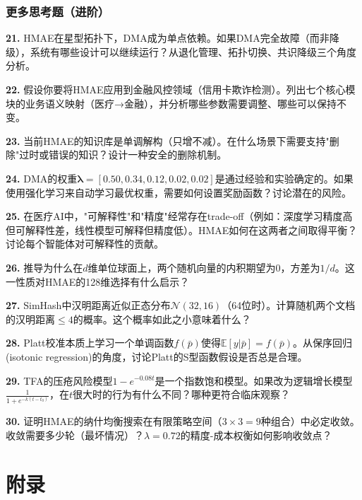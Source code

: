 \documentclass[11pt,a4paper]{ctexart}
\begin{document}
\newpage

\section{更多思考题（进阶）}

\begin{exerbox}
\textbf{21.} HMAE在星型拓扑下，DMA成为单点依赖。如果DMA完全故障（而非降级），系统有哪些设计可以继续运行？从退化管理、拓扑切换、共识降级三个角度分析。

\textbf{22.} 假设你要将HMAE应用到金融风控领域（信用卡欺诈检测）。列出七个核心模块的业务语义映射（医疗→金融），并分析哪些参数需要调整、哪些可以保持不变。

\textbf{23.} 当前HMAE的知识库是单调解构（只增不减）。在什么场景下需要支持"删除"过时或错误的知识？设计一种安全的删除机制。

\textbf{24.} DMA的权重$\boldsymbol{\lambda} = [0.50, 0.34, 0.12, 0.02, 0.02]$是通过经验和实验确定的。如果使用强化学习来自动学习最优权重，需要如何设置奖励函数？讨论潜在的风险。

\textbf{25.} 在医疗AI中，"可解释性"和"精度"经常存在trade-off（例如：深度学习精度高但可解释性差，线性模型可解释但精度低）。HMAE如何在这两者之间取得平衡？讨论每个智能体对可解释性的贡献。
\end{exerbox}

\begin{exerbox}
\textbf{26.} 推导为什么在$d$维单位球面上，两个随机向量的内积期望为0，方差为$1/d$。这一性质对HMAE的128维选择有什么启示？

\textbf{27.} SimHash中汉明距离近似正态分布$\mathcal{N}(32, 16)$（64位时）。计算随机两个文档的汉明距离$\leq 4$的概率。这个概率如此之小意味着什么？

\textbf{28.} Platt校准本质上学习一个单调函数$f(\bar{p})$使得$\mathbb{E}[y|\bar{p}] = f(\bar{p})$。从保序回归(isotonic regression)的角度，讨论Platt的S型函数假设是否总是合理。

\textbf{29.} TFA的压疮风险模型$1-e^{-0.08t}$是一个指数饱和模型。如果改为逻辑增长模型$\frac{1}{1+e^{-k(t-t_0)}}$，在$t$很大时的行为有什么不同？哪种更符合临床观察？

\textbf{30.} 证明HMAE的纳什均衡搜索在有限策略空间（$3 \times 3 = 9$种组合）中必定收敛。收敛需要多少轮（最坏情况）？$\lambda=0.72$的精度-成本权衡如何影响收敛点？
\end{exerbox}

\newpage

\part*{附录}
\end{document}
